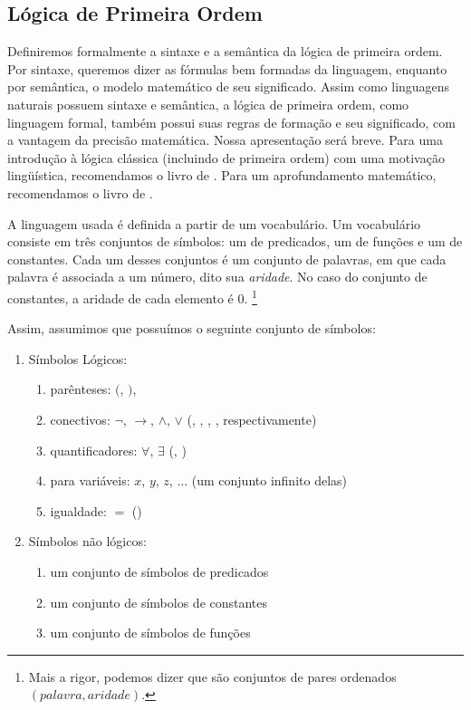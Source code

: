 \subsection{Lógica de Primeira Ordem}

Definiremos formalmente a sintaxe e a semântica da lógica de primeira ordem. Por sintaxe, queremos dizer as fórmulas bem formadas da linguagem, enquanto por semântica, o modelo matemático de seu significado. Assim como linguagens naturais possuem sintaxe e semântica, a lógica de primeira ordem, como linguagem formal, também possui suas regras de formação e seu significado, com a vantagem da precisão matemática. Nossa apresentação será breve. Para uma introdução à lógica clássica (incluindo de primeira ordem) com uma motivação lingüística, recomendamos o livro de \citet{gamut1}.  Para um aprofundamento matemático, recomendamos o livro de \citet{enderton}.

A linguagem usada é definida a partir de um vocabulário. Um vocabulário consiste em três conjuntos de símbolos: um de predicados, um de funções e um de constantes. Cada um desses conjuntos é um conjunto de palavras, em que cada palavra é associada a um número, dito sua \textit{aridade}. No caso do conjunto de constantes, a aridade de cada elemento é $0$. \footnote{Mais a rigor, podemos dizer que são conjuntos de pares ordenados $(palavra,aridade)$.}

Assim, assumimos que possuímos o seguinte conjunto de símbolos:
\begin{enumerate}
\item 	Símbolos Lógicos:
		\begin{enumerate}
		\item parênteses: $($, $)$,
		\item conectivos: $\neg$, $\rightarrow$, $\land$, $\lor$ (, , , , respectivamente)
		\item quantificadores: $\forall$, $\exists$ (, )
		\item para variáveis: $x$, $y$, $z$, $\dots$ (um conjunto infinito delas)
		\item igualdade: $=$ ()
		\end{enumerate}
\item	Símbolos não lógicos:
		\begin{enumerate}
		\item um conjunto de símbolos de predicados
		\item um conjunto de símbolos de constantes
		\item um conjunto de símbolos de funções
		\end{enumerate}
\end{enumerate}


